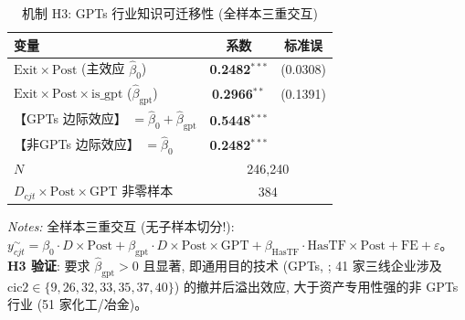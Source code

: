 \begin{table}[htbp]
\centering
\small
\caption{机制 H3: GPTs 行业知识可迁移性 (全样本三重交互)}
\label{tab:h3}
\begin{tabular}{lcc}
\hline\hline
变量 & 系数 & 标准误 \\
\hline
$\mathrm{Exit}\times\mathrm{Post}$ (主效应 $\hat{\beta}_0$) & \textbf{0.2482}$^{***}$ & (0.0308) \\
$\mathrm{Exit}\times\mathrm{Post}\times\mathrm{is\_gpt}$ ($\hat{\beta}_{\mathrm{gpt}}$) & \textbf{0.2966}$^{**}$ & (0.1391) \\
\hline
【GPTs 边际效应】 $= \hat{\beta}_0 + \hat{\beta}_{\mathrm{gpt}}$ & \textbf{0.5448}$^{***}$ \\
【非GPTs 边际效应】 $= \hat{\beta}_0$ & \textbf{0.2482}$^{***}$ \\
\hline
$N$ & \multicolumn{2}{c}{246,240} \\
$D_{cjt}\times\mathrm{Post}\times\mathrm{GPT}$ 非零样本 & \multicolumn{2}{c}{384} \\
\hline\hline
\end{tabular}
\begin{flushleft}\footnotesize
\textit{Notes:} 全样本三重交互 (无子样本切分!): $y^{\sim}_{cjt}=\beta_0 \cdot D\times\mathrm{Post}+\beta_{\mathrm{gpt}}\cdot D\times\mathrm{Post}\times\mathrm{GPT}+\beta_{\mathrm{HasTF}}\cdot\mathrm{HasTF}\times\mathrm{Post}+\mathrm{FE}+\varepsilon$。\textbf{H3 验证}: 要求 $\hat{\beta}_{\mathrm{gpt}}>0$ 且显著, 即通用目的技术 (GPTs, \citet{bresnahan1995}; 41 家三线企业涉及 $\mathrm{cic2}\in\{9, 26, 32, 33, 35, 37, 40\}$) 的撤并后溢出效应, 大于资产专用性强的非 GPTs 行业 (51 家化工/冶金)。
\end{flushleft}
\end{table}

